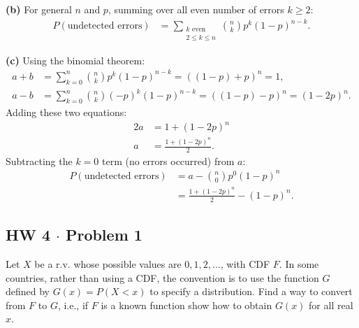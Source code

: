 \documentclass[11pt,a4paper]{article}
\begin{document}
\vspace{4pt}
\noindent \textbf{(b)} For general $n$ and $p$, summing over all even number of errors $k \ge 2$:
\begin{align*}
P(\text{undetected errors}) &= \sum_{\substack{k \text{ even} \\ 2 \le k \le n}} \binom{n}{k} p^k (1-p)^{n-k}.
\end{align*}

\vspace{4pt}
\noindent \textbf{(c)} Using the binomial theorem:
\begin{align*}
a + b &= \sum_{k=0}^{n} \binom{n}{k} p^k (1-p)^{n-k} = ( (1-p) + p )^n = 1, \\
a - b &= \sum_{k=0}^{n} \binom{n}{k} (-p)^k (1-p)^{n-k} = ( (1-p) - p )^n = (1-2p)^n.
\end{align*}
Adding these two equations:
\begin{align*}
2a &= 1 + (1-2p)^n \\
a &= \frac{1 + (1-2p)^n}{2}.
\end{align*}
Subtracting the $k = 0$ term (no errors occurred) from $a$:
\begin{align*}
P(\text{undetected errors}) &= a - \binom{n}{0} p^0 (1-p)^n \\
&= \frac{1 + (1-2p)^n}{2} - (1-p)^n.
\end{align*}

\vspace{10pt}
\subsection{HW 4 $\cdot$ Problem 1}
\begin{tcolorbox}[title={HW 4 $\cdot$ Problem 1}]
Let $X$ be a r.v. whose possible values are $0, 1, 2, \dots$, with CDF $F$. In some countries, rather than using a CDF, the convention is to use the function $G$ defined by $G(x) = P(X < x)$ to specify a distribution. Find a way to convert from $F$ to $G$, i.e., if $F$ is a known function show how to obtain $G(x)$ for all real $x$.
\end{tcolorbox}
\end{document}
